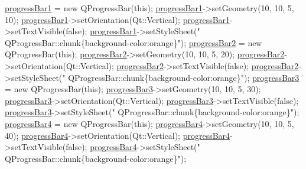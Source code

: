 \begin{DoxyCode}
    \hyperlink{classMainWindow_a50d8f5aa716821eca4ad0a3bfb0cf2ec}{progressBar1} = \textcolor{keyword}{new} QProgressBar(\textcolor{keyword}{this});
    \hyperlink{classMainWindow_a50d8f5aa716821eca4ad0a3bfb0cf2ec}{progressBar1}->setGeometry(10, 10, 5, 10);
    \hyperlink{classMainWindow_a50d8f5aa716821eca4ad0a3bfb0cf2ec}{progressBar1}->setOrientation(Qt::Vertical);
    \hyperlink{classMainWindow_a50d8f5aa716821eca4ad0a3bfb0cf2ec}{progressBar1}->setTextVisible(\textcolor{keyword}{false});
    \hyperlink{classMainWindow_a50d8f5aa716821eca4ad0a3bfb0cf2ec}{progressBar1}->setStyleSheet(\textcolor{stringliteral}{"
      QProgressBar::chunk\{background-color:orange\}"});
    \hyperlink{classMainWindow_a0594f2275ce1af436549e95cf62cfe7d}{progressBar2} = \textcolor{keyword}{new} QProgressBar(\textcolor{keyword}{this});
    \hyperlink{classMainWindow_a0594f2275ce1af436549e95cf62cfe7d}{progressBar2}->setGeometry(10, 10, 5, 20);
    \hyperlink{classMainWindow_a0594f2275ce1af436549e95cf62cfe7d}{progressBar2}->setOrientation(Qt::Vertical);
    \hyperlink{classMainWindow_a0594f2275ce1af436549e95cf62cfe7d}{progressBar2}->setTextVisible(\textcolor{keyword}{false});
    \hyperlink{classMainWindow_a0594f2275ce1af436549e95cf62cfe7d}{progressBar2}->setStyleSheet(\textcolor{stringliteral}{"
      QProgressBar::chunk\{background-color:orange\}"});
    \hyperlink{classMainWindow_a4afea90f9ba8cd1d26fa3b552639a012}{progressBar3} = \textcolor{keyword}{new} QProgressBar(\textcolor{keyword}{this});
    \hyperlink{classMainWindow_a4afea90f9ba8cd1d26fa3b552639a012}{progressBar3}->setGeometry(10, 10, 5, 30);
    \hyperlink{classMainWindow_a4afea90f9ba8cd1d26fa3b552639a012}{progressBar3}->setOrientation(Qt::Vertical);
    \hyperlink{classMainWindow_a4afea90f9ba8cd1d26fa3b552639a012}{progressBar3}->setTextVisible(\textcolor{keyword}{false});
    \hyperlink{classMainWindow_a4afea90f9ba8cd1d26fa3b552639a012}{progressBar3}->setStyleSheet(\textcolor{stringliteral}{"
      QProgressBar::chunk\{background-color:orange\}"});
    \hyperlink{classMainWindow_a8672c729ad5494d2890676bf07518ea2}{progressBar4} = \textcolor{keyword}{new} QProgressBar(\textcolor{keyword}{this});
    \hyperlink{classMainWindow_a8672c729ad5494d2890676bf07518ea2}{progressBar4}->setGeometry(10, 10, 5, 40);
    \hyperlink{classMainWindow_a8672c729ad5494d2890676bf07518ea2}{progressBar4}->setOrientation(Qt::Vertical);
    \hyperlink{classMainWindow_a8672c729ad5494d2890676bf07518ea2}{progressBar4}->setTextVisible(\textcolor{keyword}{false});
    \hyperlink{classMainWindow_a8672c729ad5494d2890676bf07518ea2}{progressBar4}->setStyleSheet(\textcolor{stringliteral}{"
      QProgressBar::chunk\{background-color:orange\}"});


\end{DoxyCode}
